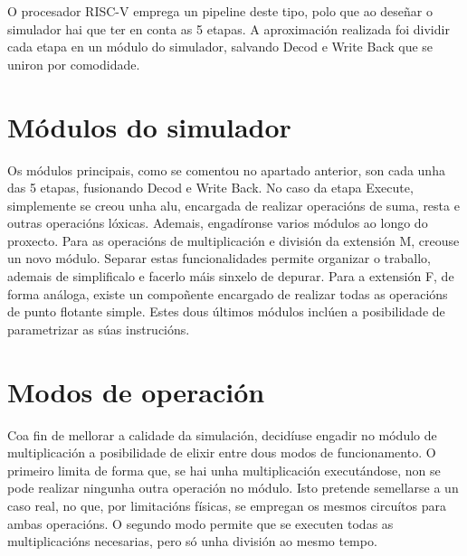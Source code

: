 O procesador RISC-V emprega un pipeline deste tipo, polo que ao deseñar o simulador hai que ter en conta as 5 etapas. A aproximación realizada foi dividir cada etapa en un módulo do simulador, salvando Decod e Write Back que se uniron por comodidade.

\section{Módulos do simulador}\label{sec:modulo_sim}
Os módulos principais, como se comentou no apartado anterior, son cada unha das 5 etapas, fusionando Decod e Write Back. No caso da etapa Execute, simplemente se creou unha \acrshort{alu}, encargada de realizar operacións de suma, resta e outras operacións lóxicas. Ademais, engadíronse varios módulos ao longo do proxecto. Para as operacións de multiplicación e división da extensión M, creouse un novo módulo. Separar estas funcionalidades permite organizar o traballo, ademais de simplificalo e facerlo máis sinxelo de depurar. Para a extensión F, de forma análoga, existe un compoñente encargado de realizar todas as operacións de punto flotante simple. Estes dous últimos módulos inclúen a posibilidade de parametrizar as súas instrucións. 

\section{Modos de operación}\label{sec:modos_op}
Coa fin de mellorar a calidade da simulación, decidíuse engadir no módulo de multiplicación a posibilidade de elixir entre dous modos de funcionamento. O primeiro limita de forma que, se hai unha multiplicación executándose, non se pode realizar ningunha outra operación no módulo. Isto pretende semellarse a un caso real, no que, por limitacións físicas, se empregan os mesmos circuítos para ambas operacións. O segundo modo permite que se executen todas as multiplicacións necesarias, pero só unha división ao mesmo tempo.


